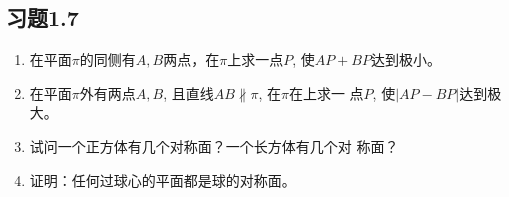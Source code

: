 \begin{solution}
    
\end{solution}

\begin{solution}
    
\end{solution}
\begin{example}
    
\end{example}

\begin{solution}
    
\end{solution}
\begin{example}
    
\end{example}

\begin{solution}
    
\end{solution}
\begin{example}
    
\end{example}


\begin{solution}
    
\end{solution}
\begin{example}
    
\end{example}

\begin{example}
    
\end{example}
\begin{example}
    
\end{example}





\subsection*{习题1.7}
\begin{enumerate}
    \item 在平面$\pi$的同侧有$A,B$两点，在$\pi$上求一点$P$, 使$AP+
    BP$达到极小。
    \item 在平面$\pi$外有两点$A,B$, 且直线$AB\nparallel \pi$, 在$\pi$在上求一
    点$P$, 使$|AP-BP|$达到极大。
    \item 试问一个正方体有几个对称面？一个长方体有几个对
    称面？
    \item 证明：任何过球心的平面都是球的对称面。
\end{enumerate}

